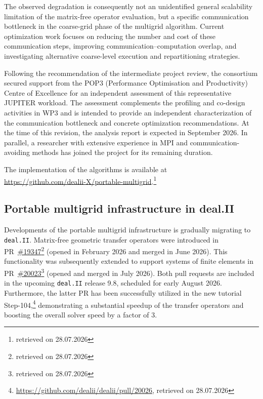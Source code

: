 \documentclass[a4paper,12pt]{article}
\begin{document}
The observed degradation is consequently not an unidentified general
scalability limitation of the matrix-free operator evaluation, but a specific
communication bottleneck in the coarse-grid phase of the multigrid algorithm.
Current optimization work focuses on reducing the number and cost of these
communication steps, improving communication--computation overlap, and
investigating alternative coarse-level execution and repartitioning
strategies.

Following the recommendation of the intermediate project review, the
consortium secured support from the POP3 (Performance Optimisation and
Productivity) Centre of Excellence for an independent assessment of this
representative JUPITER workload. The assessment complements the profiling and
co-design activities in WP3 and is intended to provide an independent
characterization of the communication bottleneck and concrete optimization
recommendations. At the time of this revision, the analysis report is
expected in September 2026. In parallel, a researcher with extensive
experience in MPI and communication-avoiding methods has joined the project
for its remaining duration.

The implementation of the algorithms is available at \\ \url{https://github.com/dealii-X/portable-multigrid}.\footnote{retrieved on 28.07.2026}

\subsection{Portable multigrid infrastructure in deal.II}

Developments of the portable multigrid infrastructure is gradually migrating to \texttt{deal.II}. Matrix-free geometric transfer operators were introduced in PR~\href{https://github.com/dealii/dealii/pull/19347}{\#19347}\footnote{retrieved on 28.07.2026} (opened in February 2026 and merged in June 2026). This functionality was subsequently extended to support systems of finite elements in PR~\href{https://github.com/dealii/dealii/pull/20023}{\#20023}\footnote{retrieved on 28.07.2026} (opened and merged in July 2026). Both pull requests are included in the upcoming \texttt{deal.II} release 9.8, scheduled for early August 2026. Furthermore, the latter PR has been successfully utilized in the new tutorial Step-104,\footnote{\url{https://github.com/dealii/dealii/pull/20026}, retrieved on 28.07.2026} demonstrating a substantial speedup of the transfer operators and boosting the overall solver speed by a factor of 3.
\end{document}
